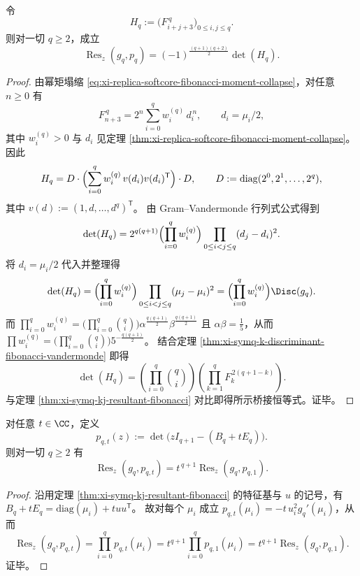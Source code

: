 \begin{proposition}\label{prop:xi-symq-hankel-sylvester-bridge}
令
\[
H_q:=\bigl(F_{i+j+3}^{\,q}\bigr)_{0\le i,j\le q}.
\]
则对一切 \(q\ge 2\)，成立
\[
\operatorname{Res}_z(g_q,p_q)
=(-1)^{\frac{(q+1)(q+2)}2}\det(H_q).
\]
\end{proposition}
\begin{proof}
由幂矩塌缩 \eqref{eq:xi-replica-softcore-fibonacci-moment-collapse}，对任意 \(n\ge 0\) 有
\[
F_{n+3}^{\,q}=2^{n}\sum_{i=0}^{q}w_i^{(q)}\,d_i^{\,n},
\qquad
d_i=\mu_i/2,
\]
其中 \(w_i^{(q)}>0\) 与 \(d_i\) 见定理 \ref{thm:xi-replica-softcore-fibonacci-moment-collapse}。
因此
\[
H_q
=D\cdot \Bigl(\sum_{i=0}^{q}w_i^{(q)}\,v(d_i)v(d_i)^{\mathsf T}\Bigr)\cdot D,
\qquad
D:=\mathrm{diag}(2^0,2^1,\dots,2^{q}),
\]
其中 \(v(d):=(1,d,\dots,d^{q})^{\mathsf T}\)。
由 Gram--Vandermonde 行列式公式得到
\[
\det(H_q)
=2^{q(q+1)}\Bigl(\prod_{i=0}^{q}w_i^{(q)}\Bigr)\prod_{0\le i<j\le q}(d_j-d_i)^2.
\]
将 \(d_i=\mu_i/2\) 代入并整理得
\[
\det(H_q)
=\Bigl(\prod_{i=0}^{q}w_i^{(q)}\Bigr)\prod_{0\le i<j\le q}(\mu_j-\mu_i)^2
=\Bigl(\prod_{i=0}^{q}w_i^{(q)}\Bigr)\Disc(g_q).
\]
而 \(\prod_{i=0}^{q}w_i^{(q)}=\bigl(\prod_{i=0}^{q}\binom{q}{i}\bigr)\alpha^{\frac{q(q+1)}2}\beta^{\frac{q(q+1)}2}\)
且 \(\alpha\beta=\frac15\)，从而
\(\prod w_i^{(q)}=\bigl(\prod_{i=0}^{q}\binom{q}{i}\bigr)5^{-\frac{q(q+1)}2}\)。
结合定理 \ref{thm:xi-symq-k-discriminant-fibonacci-vandermonde} 即得
\[
\det(H_q)
=\left(\prod_{i=0}^{q}\binom{q}{i}\right)\left(\prod_{k=1}^{q}F_k^{\,2(q+1-k)}\right).
\]
与定理 \ref{thm:xi-symq-kj-resultant-fibonacci} 对比即得所示桥接恒等式。证毕。
\end{proof}

\begin{proposition}[耦合参数的主因子定律]\label{prop:xi-symq-rankone-coupling-t-power}
对任意 \(t\in\CC\)，定义
\[
p_{q,t}(z):=\det\!\bigl(zI_{q+1}-(B_q+tE_q)\bigr).
\]
则对一切 \(q\ge 2\) 有
\[
\operatorname{Res}_z(g_q,p_{q,t})
=t^{\,q+1}\operatorname{Res}_z(g_q,p_{q,1}).
\]
\end{proposition}
\begin{proof}
沿用定理 \ref{thm:xi-symq-kj-resultant-fibonacci} 的特征基与 \(u\) 的记号，有
\(
B_q+tE_q=\mathrm{diag}(\mu_i)+tuu^{\mathsf T}
\)。
故对每个 \(\mu_i\) 成立 \(p_{q,t}(\mu_i)=-t\,u_i^2g_q'(\mu_i)\)，从而
\[
\operatorname{Res}_z(g_q,p_{q,t})
=\prod_{i=0}^{q}p_{q,t}(\mu_i)
=t^{q+1}\prod_{i=0}^{q}p_{q,1}(\mu_i)
=t^{q+1}\operatorname{Res}_z(g_q,p_{q,1}).
\]
证毕。
\end{proof}

